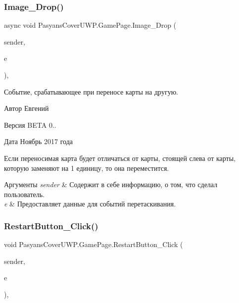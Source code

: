 \subsubsection{\texorpdfstring{Image\+\_\+\+Drop()}{Image\_Drop()}}
{\footnotesize\ttfamily async void Pasyans\+Cover\+U\+W\+P.\+Game\+Page.\+Image\+\_\+\+Drop (\begin{DoxyParamCaption}\item[{object}]{sender,  }\item[{Drag\+Event\+Args}]{e }\end{DoxyParamCaption})\hspace{0.3cm}{\ttfamily [inline]}, {\ttfamily [private]}}



Событие, срабатывающее при переносе карты на другую. 

\begin{DoxyAuthor}{Автор}
Евгений 
\end{DoxyAuthor}
\begin{DoxyVersion}{Версия}
B\+E\+TA 0.. 
\end{DoxyVersion}
\begin{DoxyDate}{Дата}
Ноябрь 2017 года
\end{DoxyDate}
Если переносимая карта будет отличаться от карты, стоящей слева от карты, которую заменяют на 1 единицу, то она переместится. 
\begin{DoxyParams}{Аргументы}
{\em sender} & Содержит в себе информацию, о том, что сделал пользователь. \\
\hline
{\em e} & Предоставляет данные для событий перетаскивания. \\
\hline
\end{DoxyParams}
\mbox{\label{class_pasyans_cover_u_w_p_1_1_game_page_a204ffa1fc3084fe28bef4826572bbc22}} 
\subsubsection{\texorpdfstring{Restart\+Button\+\_\+\+Click()}{RestartButton\_Click()}}
{\footnotesize\ttfamily void Pasyans\+Cover\+U\+W\+P.\+Game\+Page.\+Restart\+Button\+\_\+\+Click (\begin{DoxyParamCaption}\item[{object}]{sender,  }\item[{Routed\+Event\+Args}]{e }\end{DoxyParamCaption})\hspace{0.3cm}{\ttfamily [inline]}, {\ttfamily [private]}}




